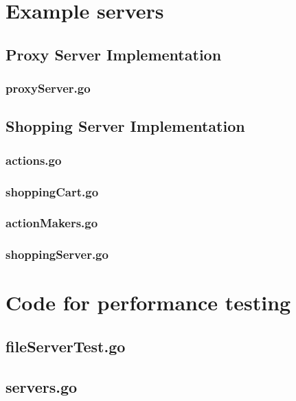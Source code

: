 \begin{appendices}
\section{Example servers}

\subsection{Proxy Server Implementation}
\subsubsection{proxyServer.go}


\newpage
\subsection{Shopping Server Implementation}
\subsubsection{actions.go}

\subsubsection{shoppingCart.go}

\subsubsection{actionMakers.go}

\newpage
\subsubsection{shoppingServer.go}


\newpage
\section{Code for performance testing}
\subsection{fileServerTest.go}


\subsection{servers.go}



\end{appendices}
